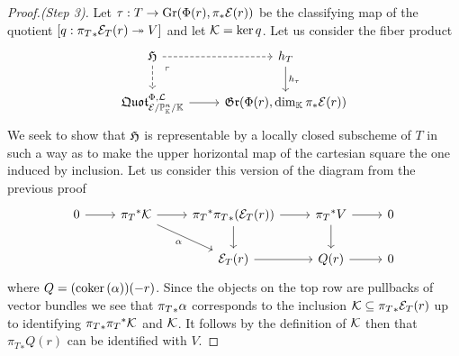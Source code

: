 \begin{proof}[Proof.(Step 3)]
Let $\tau:T\to \mathrm{Gr}(\Phi(r),\pi_\ast\mathcal{E}(r))$ be the classifying map of the quotient $[q:{\pi_T}_\ast\mathcal{E}_T(r)\twoheadrightarrow V]$ and let $\mathcal{K}=\ker q$. Let us consider the fiber product
\[\begin{tikzcd}
	\Hf & {h_T} \\
	{\quotf^{\Phi,\Lc}_{\Ec/\Pj^n_\K/\K}} & {\gr(\Phi(r),\dim_\K\pi_\ast\Ec(r))}
	\arrow[dashed, from=1-1, to=1-2]
	\arrow[dashed, from=1-1, to=2-1]
	\arrow["{h_\tau}", from=1-2, to=2-2]
	\arrow[""{name=0, anchor=center, inner sep=0}, from=2-1, to=2-2]
	\arrow["\ulcorner"{anchor=center, pos=0.125}, draw=none, from=1-1, to=0]
\end{tikzcd}\]
We seek to show that $\mathfrak{H}$ is representable by a locally closed subscheme of $T$ in such a way as to make the upper horizontal map of the cartesian square the one induced by inclusion. Let us consider this version of the diagram from the previous proof
\[\begin{tikzcd}
	0 & {{\pi_T}^\ast\Kc} & {{\pi_T}^\ast{\pi_T}_\ast(\Ec_T(r))} & {{\pi_T}^\ast V} & 0 \\
	&& {\Ec_T(r)} & {Q(r)} & 0
	\arrow[from=1-1, to=1-2]
	\arrow[from=1-2, to=1-3]
	\arrow["\al"', from=1-2, to=2-3]
	\arrow[from=1-3, to=1-4]
	\arrow[from=1-3, to=2-3]
	\arrow[from=1-4, to=1-5]
	\arrow[from=1-4, to=2-4]
	\arrow[from=2-3, to=2-4]
	\arrow[from=2-4, to=2-5]
\end{tikzcd}\]
where $Q=(\mathrm{coker}\,(\alpha))(-r)$. Since the objects on the top row are pullbacks of vector bundles we see that ${\pi_T}_\ast\alpha$ corresponds to the inclusion $\mathcal{K}\subseteq {\pi_T}_\ast\mathcal{E}_T(r)$ up to identifying ${\pi_T}_\ast{\pi_T}^\ast\mathcal{K}$ and $\mathcal{K}$. It follows by the definition of $\mathcal{K}$ then that ${\pi_T}_\ast Q(r)$ can be identified with $V$.


\end{proof}
